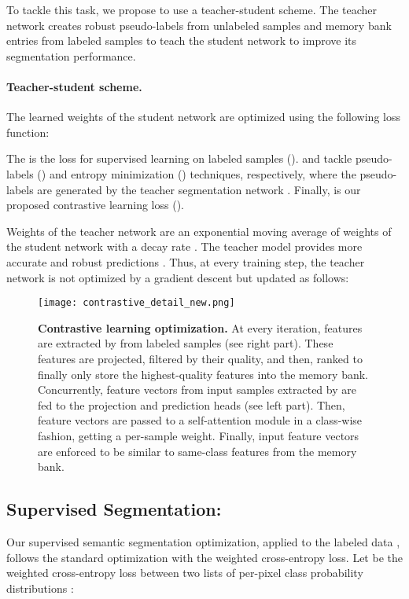\documentclass[10pt,twocolumn,letterpaper]{article}
\begin{document}
To tackle this task, we propose to use a teacher-student scheme. The teacher network  creates robust pseudo-labels from unlabeled samples and memory bank entries from labeled samples to teach the student network  to improve its segmentation performance.

\paragraph{Teacher-student scheme.} The learned weights  of the student network  are optimized using the following loss function:

The  is the loss for supervised learning on labeled samples ().  and  tackle pseudo-labels () and entropy minimization () techniques, respectively, where the pseudo-labels are generated by the teacher segmentation network . Finally,  is our proposed contrastive learning loss ().

Weights  of the teacher network  are an exponential moving average of weights  of the student network  with a decay rate . The teacher model provides more accurate and robust predictions \cite{tarvainen2017mean}.
Thus, at every training step, the teacher network  is not optimized by a gradient descent but updated as follows:

 
\begin{figure*}[!tb]
\centering
\texttt{[image: contrastive\_detail\_new.png]}
\caption{
\textbf{Contrastive learning optimization.} At every iteration, features are extracted by  from labeled samples (see right part). These features are projected, filtered by their quality, and then, ranked to finally only store the highest-quality features into the memory bank.
Concurrently, feature vectors from input samples extracted by  are fed to the projection and prediction heads (see left part). Then, feature vectors are passed to a self-attention module in a class-wise fashion, getting a per-sample weight. Finally, input feature vectors are enforced to be similar to same-class features from the memory bank.}
\label{fig:contrastive}
\end{figure*}

\subsection{Supervised Segmentation: }
\label{sec:supervised}
Our supervised semantic segmentation optimization, applied to the labeled data , follows the standard optimization with the weighted cross-entropy loss. Let  be the weighted cross-entropy loss between two lists of  per-pixel class probability distributions :
\end{document}
